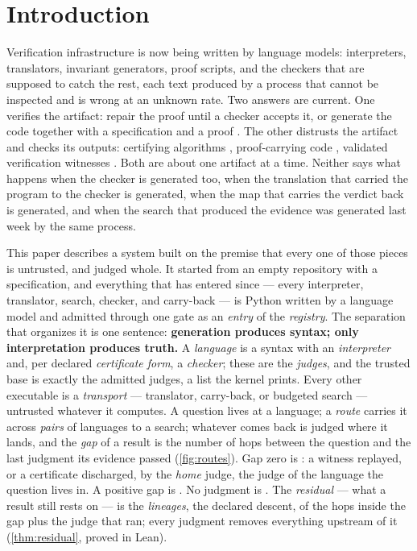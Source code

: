 
\section{Introduction}
\label{sec:intro}

Verification infrastructure is now being written by language models:
interpreters, translators, invariant generators, proof scripts, and
the checkers that are supposed to catch the rest, each text produced
by a process that cannot be inspected and is wrong at an unknown
rate. Two answers are current. One verifies the artifact: repair the proof until
a checker accepts it, or generate the code together with a
specification and a proof \citep{first2023baldur,sun2024clover}. The
other distrusts the artifact and checks its outputs: certifying
algorithms \citep{mcconnell2011certifying}, proof-carrying code
\citep{necula1997pcc}, validated verification witnesses
\citep{beyer2015witnesses}. Both are about one artifact at a time.
Neither says what happens when the checker is generated too, when the
translation that carried the program to the checker is generated,
when the map that carries the verdict back is generated, and when the
search that produced the evidence was generated last week by the same
process.

This paper describes a system built on the premise that every one of
those pieces is untrusted, and judged whole. It started from an empty
repository with a specification, and everything that has entered
since --- every interpreter, translator, search, checker, and
carry-back --- is Python written by a language model and admitted
through one gate as an \emph{entry} of the \emph{registry}. The separation that organizes it is one sentence:
\textbf{generation produces syntax; only interpretation produces
truth.} A \emph{language} is a syntax with an \emph{interpreter} and,
per declared \emph{certificate form}, a \emph{checker}; these are the
\emph{judges}, and the trusted base is exactly the admitted judges, a
list the kernel prints. Every other executable is a \emph{transport}
--- translator, carry-back, or budgeted search --- untrusted whatever
it computes. A question lives at a language; a \emph{route} carries it across \emph{pairs} of
languages to a search; whatever comes back is judged where it lands,
and the \emph{gap} of a result is the number of hops between the
question and the last judgment its evidence passed
(\cref{fig:routes}). Gap zero is : a witness
replayed, or a certificate discharged, by the \emph{home} judge, the
judge of the language the question lives in. A positive
gap is . No judgment is . The
\emph{residual} --- what a result still rests on --- is the
\emph{lineages}, the declared descent, of the hops inside the gap plus
the judge that ran; every judgment
removes everything upstream of it (\cref{thm:residual}, proved in
Lean).

